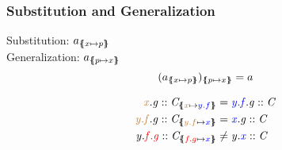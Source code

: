 \documentclass[leqno]{beamer}
\begin{document}
\begin{frame}
\frametitle{Substitution and Generalization}
Substitution: $a_{\{\mskip-6.9mu\{ x \mapsto p \}\mskip-6.9mu\}}$\\
Generalization: $a_{\{\mskip-6.9mu\{ p \mapsto x \}\mskip-6.9mu\}}$
\[(a_{\{\mskip-6.9mu\{ x \mapsto p \}\mskip-6.9mu\}})_{\{\mskip-6.9mu\{ p \mapsto x \}\mskip-6.9mu\}} = a\]

\begin{align*}
\instOf{{\color{brown}x}.g}{C}_{\sub{{\color{brown}x}}{{\color{blue}y.f}}} &= \instOf{{\color{blue}y.f}.g}{C}\\
\instOf{{\color{brown}y.f}.g}{C}_{\sub{{\color{brown}y.f}}{{\color{blue}x}}} &= \instOf{{\color{blue}x}.g}{C}\\
\instOf{y.{\color{red}f.g}}{C}_{\sub{{\color{red}f.g}}{{\color{blue}x}}} &\neq \instOf{y.{\color{blue}x}}{C}
\end{align*}
\end{frame}
\end{document}
